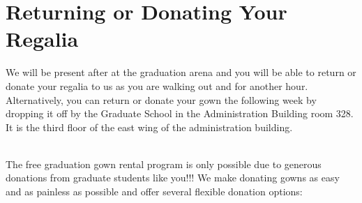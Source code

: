 \documentclass{tufte-handout}
\begin{document}
\vspace*{.2\baselineskip} %

\section{Returning or Donating Your Regalia}
We will be present after at the graduation arena and you will be able to return or donate your regalia to us as you are walking out and for another hour.  Alternatively, you can return or donate your gown the following week by dropping it off by the Graduate School in the Administration Building room 328. It is the third floor of the east wing of the administration building.

~\\
\noindent The free graduation gown rental program is only possible due to generous donations from graduate students like you!!! We make donating gowns as easy and as painless as possible and offer several flexible donation options:
\end{document}
